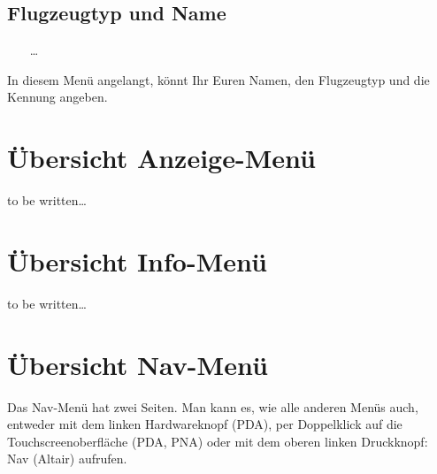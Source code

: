 \subsection{Flugzeugtyp und Name}
\begin{center}
\blink~\blink~\blink~ \far \far \dots \qquad {}\bblitz
\end{center}
In diesem Menü angelangt, könnt Ihr Euren Namen, den Flugzeugtyp und die Kennung angeben.


\section{Übersicht Anzeige-Menü}\label{Blitz-Anzeige}
to be written\dots
\section{Übersicht Info-Menü}\label{Blitz-Anzeige}
to be written\dots
\section{Übersicht Nav-Menü}\label{Blitz-Nav}
Das \textsf{Nav}-Menü  hat zwei Seiten. Man kann es, wie alle anderen Menüs auch, entweder mit dem linken Hardwareknopf (\textsf{PDA}), per Doppelklick auf die Touchscreenoberfläche  (\textsf{\textsf{PDA, PNA}}) oder mit dem oberen linken Druckknopf: \textsf{Nav} (\textsf{Altair}) aufrufen.

